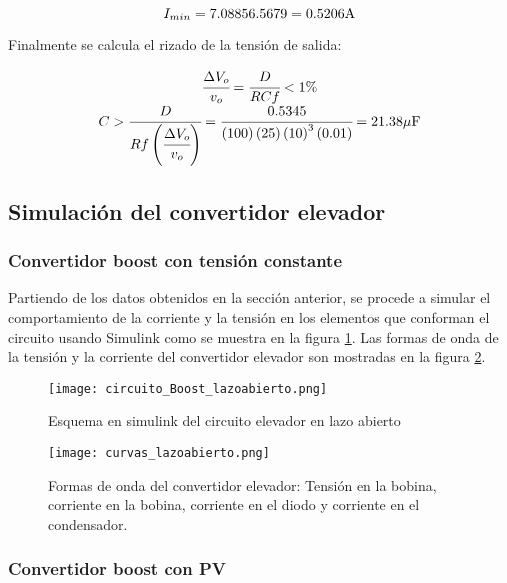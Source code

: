 \documentclass[10pt,twocolumn]{article}
\begin{document}
\begin{equation*}
	I_{min} = 7.0885  6.5679 = 0.5206 \textup{A}
\end{equation*}

Finalmente se calcula el rizado de la tensión de salida:

\begin{equation*}
	\begin{matrix}
		\cfrac{\Delta V_o}{v_o} = \cfrac{D}{RCf} < 1 \% \\ 
		C > \cfrac{D}{Rf\left ( \cfrac{\Delta V_o}{v_o} \right )} = \cfrac{0.5345}{\left ( 100 \right )\left ( 25 \right )\left ( 10 \right )^{3}\left ( 0.01 \right )} = 21.38 \mu \textup{F}
	\end{matrix}
\end{equation*}

\subsection{Simulación del convertidor elevador}

\subsubsection{Convertidor boost con tensión constante}

Partiendo de los datos obtenidos en la sección anterior, se procede a simular el comportamiento de la corriente y la tensión en los elementos que conforman el circuito usando Simulink como se muestra en la figura \ref{circuito_boost_lazoabierto}. Las formas de onda de la tensión y la corriente del convertidor elevador son mostradas en la figura \ref{curvas_lazoabierto}.

\begin{figure}[h]
	\centering
	\texttt{[image: circuito\_Boost\_lazoabierto.png]}
	\caption{Esquema en simulink del circuito elevador en lazo abierto}
	\label{circuito_boost_lazoabierto}
\end{figure}

\begin{figure}[h]
	\centering
	\texttt{[image: curvas\_lazoabierto.png]}
	\caption{Formas de onda del convertidor elevador: Tensión en la bobina, corriente en la bobina, corriente en el diodo y corriente en el condensador.}
	\label{curvas_lazoabierto}
\end{figure}

\subsubsection{Convertidor boost con PV}
\end{document}
